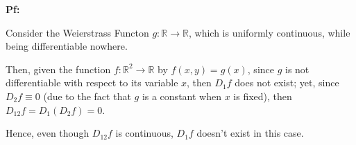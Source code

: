 \documentclass{article}
\begin{document}
\textbf{Pf:}

Consider the Weierstrass Functon $g:\mathbb{R}\rightarrow\mathbb{R}$, which is uniformly continuous, while being differentiable nowhere.

Then, given the function $f:\mathbb{R}^2\rightarrow\mathbb{R}$ by $f(x,y)=g(x)$, since $g$ is not differentiable with respect to its variable $x$, then $D_1f$ does not exist; yet, since $D_2f \equiv 0$ (due to the fact that $g$ is a constant when $x$ is fixed), then $D_{12}f = D_1(D_2f) = 0$.

Hence, even though $D_{12}f$ is continuous, $D_1f$ doesn't exist in this case.
\end{document}
